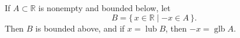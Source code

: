 If $A \subset \mathbb{R}$ is nonempty and bounded below, let
\begin{equation*}
B = \{\, x \in \mathbb{R} \mid -x \in A \,\}.
\end{equation*}
Then $B$ is bounded above, and if $x = \operatorname{lub} B$, then $-x = \operatorname{glb} A$.
